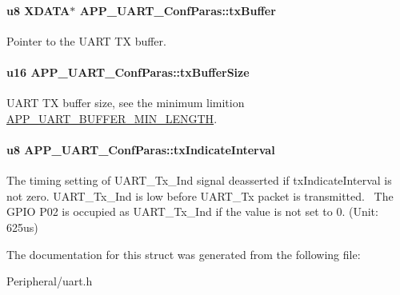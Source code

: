 \paragraph[{\texorpdfstring{tx\+Buffer}{txBuffer}}]{\setlength{\rightskip}{0pt plus 5cm}u8 X\+D\+A\+TA$\ast$ A\+P\+P\+\_\+\+U\+A\+R\+T\+\_\+\+Conf\+Paras\+::tx\+Buffer}\hypertarget{struct_a_p_p___u_a_r_t___conf_paras_a630a0cba4876c9d9139695ac3b7c7ca5}{}\label{struct_a_p_p___u_a_r_t___conf_paras_a630a0cba4876c9d9139695ac3b7c7ca5}
Pointer to the U\+A\+RT TX buffer. 
\paragraph[{\texorpdfstring{tx\+Buffer\+Size}{txBufferSize}}]{\setlength{\rightskip}{0pt plus 5cm}u16 A\+P\+P\+\_\+\+U\+A\+R\+T\+\_\+\+Conf\+Paras\+::tx\+Buffer\+Size}\hypertarget{struct_a_p_p___u_a_r_t___conf_paras_a82655de0151751621b334938ee53bd8d}{}\label{struct_a_p_p___u_a_r_t___conf_paras_a82655de0151751621b334938ee53bd8d}
U\+A\+RT TX buffer size, see the minimum limition \hyperlink{group___u_a_r_t___m_i_n_i_m_u_m___b_u_f_f_e_r___l_e_n_ga51ca08a6719a231ab16b26d5f7b1eb1f}{A\+P\+P\+\_\+\+U\+A\+R\+T\+\_\+\+B\+U\+F\+F\+E\+R\+\_\+\+M\+I\+N\+\_\+\+L\+E\+N\+G\+TH}. 
\paragraph[{\texorpdfstring{tx\+Indicate\+Interval}{txIndicateInterval}}]{\setlength{\rightskip}{0pt plus 5cm}u8 A\+P\+P\+\_\+\+U\+A\+R\+T\+\_\+\+Conf\+Paras\+::tx\+Indicate\+Interval}\hypertarget{struct_a_p_p___u_a_r_t___conf_paras_aaf8ef206c38d3b47a4e730f799c82846}{}\label{struct_a_p_p___u_a_r_t___conf_paras_aaf8ef206c38d3b47a4e730f799c82846}
The timing setting of U\+A\+R\+T\+\_\+\+Tx\+\_\+\+Ind signal deasserted if tx\+Indicate\+Interval is not zero. U\+A\+R\+T\+\_\+\+Tx\+\_\+\+Ind is low before U\+A\+R\+T\+\_\+\+Tx packet is transmitted.~\newline
 The G\+P\+IO P02 is occupied as U\+A\+R\+T\+\_\+\+Tx\+\_\+\+Ind if the value is not set to 0. (Unit\+: 625us) 

The documentation for this struct was generated from the following file\+:\begin{DoxyCompactItemize}
\item 
Peripheral/uart.\+h\end{DoxyCompactItemize}
